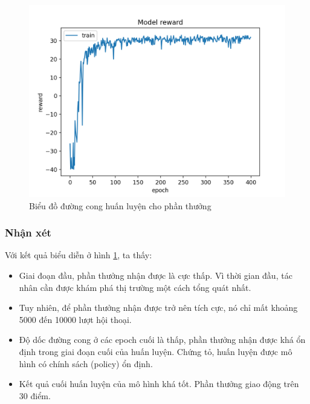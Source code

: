 \begin{figure}[ht!]
    \centering
    \includegraphics[scale=0.95]{thesis/chatbot/ketqua/img/rewardtrain.png}
    \caption{Biểu đồ đường cong huấn luyện cho phần thưởng}
    \label{fig:rewardtrain}
\end{figure}

\subsubsection{Nhận xét}
Với kết quả biểu diễn ở hình \ref{fig:rewardtrain}, ta thấy:

\begin{itemize}
    \item Giai đoạn đầu, phần thưởng nhận được là cực thấp.
    Vì thời gian đầu, tác nhân cần được khám phá thị trường
    một cách tổng quát nhất.
    \item Tuy nhiên, để phần thưởng nhận được trở nên tích cực,
    nó chỉ mất khoảng 5000 đến 10000 lượt hội thoại.
    \item Độ dốc đường cong ở các epoch cuối là thấp, phần thưởng
    nhận được khá ổn định trong giai đoạn cuối của huấn luyện.
    Chứng tỏ, huấn luyện được mô hình có chính sách (policy) ổn định.
    \item Kết quả cuối huấn luyện của mô hình khá tốt.
    Phần thưởng giao động trên 30 điểm.
\end{itemize}


